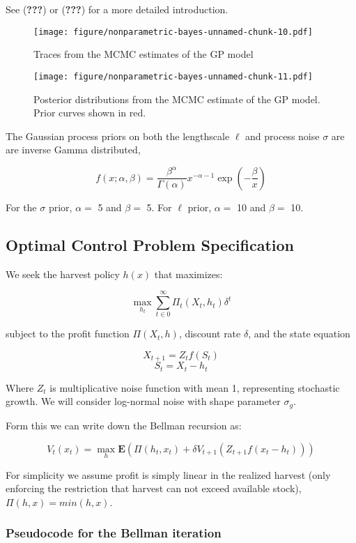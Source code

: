 \documentclass[author-year, review]{elsarticle} %
\makeatletter
\def\maxwidth{\ifdim\Gin@nat@width>\linewidth\linewidth
\else\Gin@nat@width\fi}
\let\Oldincludegraphics\includegraphics
\renewcommand{\includegraphics}[1]{\Oldincludegraphics[width=\maxwidth]{#1}}
\makeatother
\begin{document}
See ({\textbf{???}}) or ({\textbf{???}}) for a more detailed
introduction.

\begin{figure}[htbp]
\centering
\texttt{[image: figure/nonparametric-bayes-unnamed-chunk-10.pdf]}
\caption{Traces from the MCMC estimates of the GP model}
\end{figure}

\begin{figure}[htbp]
\centering
\texttt{[image: figure/nonparametric-bayes-unnamed-chunk-11.pdf]}
\caption{Posterior distributions from the MCMC estimate of the GP model.
Prior curves shown in red.}
\end{figure}

The Gaussian process priors on both the lengthscale $\ell$ and process
noise $\sigma$ are are inverse Gamma distributed,

\[f(x; \alpha, \beta) = \frac{\beta^\alpha}{\Gamma(\alpha)} x^{-\alpha - 1}\exp\left(-\frac{\beta}{x}\right)\]

For the $\sigma$ prior, $\alpha = $ 5 and $\beta = $ 5. For $\ell$
prior, $\alpha = $ 10 and $\beta = $ 10.

\subsection{Optimal Control Problem
Specification}\label{optimal-control-problem-specification}

We seek the harvest policy $h(x)$ that maximizes:

\[ \max_{h_t} \sum_{t \in 0}^{\infty}  \Pi_t(X_t, h_t) \delta^t  \]

subject to the profit function $\Pi(X_t,h)$, discount rate $\delta$, and
the state equation

\[X_{t+1} = Z_t f(S_t)  \] \[S_t = X_t - h_t \]

Where $Z_t$ is multiplicative noise function with mean 1, representing
stochastic growth. We will consider log-normal noise with shape
parameter $\sigma_g$.

Form this we can write down the Bellman recursion as:

\[V_t(x_t) = \max_h \mathbf{E} \left(\Pi(h_t, x_t) + \delta V_{t+1}( Z_{t+1} f(x_t - h_t)) \right)\]

For simplicity we assume profit is simply linear in the realized harvest
(only enforcing the restriction that harvest can not exceed available
stock), $\Pi(h,x) = min(h,x)$.

\subsubsection{Pseudocode for the Bellman
iteration}\label{pseudocode-for-the-bellman-iteration}
\end{document}
